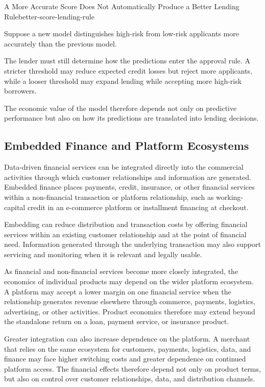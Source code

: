 \begin{example}{A More Accurate Score Does Not Automatically Produce a Better Lending Rule}{better-score-lending-rule}

Suppose a new model distinguishes high-risk from low-risk applicants more accurately than the previous model.

The lender must still determine how the predictions enter the approval rule. A stricter threshold may reduce expected credit losses but reject more applicants, while a looser threshold may expand lending while accepting more high-risk borrowers.

The economic value of the model therefore depends not only on predictive performance but also on how its predictions are translated into lending decisions.

\end{example}

\subsection[Embedded Finance and Platform Ecosystems]{Embedded Finance and Platform Ecosystems}

Data-driven financial services can be integrated directly into the commercial activities through which customer relationships and information are generated. Embedded finance places payments, credit, insurance, or other financial services within a non-financial transaction or platform relationship, such as working-capital credit in an e-commerce platform or installment financing at checkout.

Embedding can reduce distribution and transaction costs by offering financial services within an existing customer relationship and at the point of financial need. Information generated through the underlying transaction may also support servicing and monitoring when it is relevant and legally usable.

As financial and non-financial services become more closely integrated, the economics of individual products may depend on the wider platform ecosystem. A platform may accept a lower margin on one financial service when the relationship generates revenue elsewhere through commerce, payments, logistics, advertising, or other activities. Product economics therefore may extend beyond the standalone return on a loan, payment service, or insurance product.

Greater integration can also increase dependence on the platform. A merchant that relies on the same ecosystem for customers, payments, logistics, data, and finance may face higher switching costs and greater dependence on continued platform access. The financial effects therefore depend not only on product terms, but also on control over customer relationships, data, and distribution channels.

